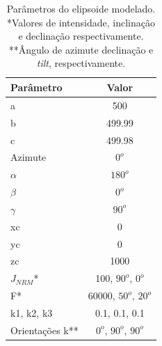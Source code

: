 \begin{table}[h]
	\begin{center}
		\begin{tabular}{|l|c|}
			\hline
			\textbf{Parâmetro}  & \textbf{Valor}  \\
			\hline 
			a   & 500 \\
			\hline
			b   & 499.99  \\
			\hline
			c   & 499.98 \\
			\hline
			Azimute   & $0^o$ \\
			\hline
			$\alpha$    & $180^o$   \\
			\hline
			$\beta$    & $0^o$ \\
			\hline
			$\gamma$   & $90^o$  \\
			\hline
			xc   & 0  \\
			\hline          
			yc   & 0  \\
			\hline                
			zc   & 1000  \\
			\hline
			$J_{NRM}$*  & 100, $90^o$, $0^o$  \\
			\hline
			F*    & 60000, $50^o$, $20^o$ \\
			\hline
			k1, k2, k3   & 0.1, 0.1, 0.1  \\
			\hline
			Orientações k**   & $0^o$, $90^o$, $90^o$  \\
			\hline
		\end{tabular}
		\caption{Parâmetros do elipsoide modelado. *Valores de intensidade, inclinação e declinação respectivamente. **Ângulo de azimute
			declinação e \textit{tilt}, respectivamente.}
	\end{center}
	\label{tab:triaxial_oblate1}
\end{table}

